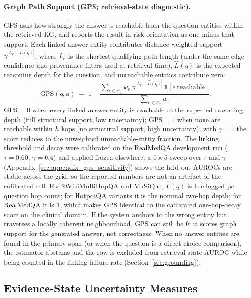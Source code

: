 \paragraph{Graph Path Support (GPS; retrieval-state diagnostic).}
GPS asks how strongly the answer is reachable from the question entities
within the retrieved KG, and reports the result in risk orientation as one
minus that support.
Each linked answer entity contributes distance-weighted support
$\gamma^{|L_e-\hat L(q)|}$, where $L_e$ is the shortest qualifying path
length (under the same edge-confidence and provenance filters used at
retrieval time), $\hat L(q)$ is the expected reasoning depth for the question,
and unreachable entities contribute zero:
\begin{equation}
  \mathrm{GPS}(q, a) \;=\;
  1 -
  \frac{\sum_{e \in \mathcal{E}_a} w_e\, \gamma^{|L_e-\hat L(q)|}\,
        \mathbb{1}[e\ \mathrm{reachable}]}
       {\sum_{e \in \mathcal{E}_a} w_e}.
\end{equation}
$\mathrm{GPS} = 0$ when every linked answer entity is reachable at the
expected reasoning depth (full structural support, low uncertainty);
$\mathrm{GPS} = 1$ when none are reachable within $h$ hops (no structural
support, high uncertainty); with $\gamma = 1$ the score reduces to the
unweighted unreachable-entity fraction.
The linking threshold and decay were calibrated on the RealMedQA development
run ($\tau = 0.60$, $\gamma = 0.4$) and applied frozen elsewhere; a
$5\times5$ sweep over $\tau$ and $\gamma$
(Appendix~\ref{sec:appendix_gps_sensitivity}) shows the held-out AUROCs are
stable across the grid, so the reported numbers are not an artefact of the
calibrated cell.
For 2WikiMultiHopQA and MuSiQue, $\hat L(q)$ is the logged per-question hop
count; for HotpotQA variants it is the nominal two-hop depth; for RealMedQA it
is $1$, which makes GPS identical to the calibrated one-hop-decay score on
the clinical domain.
If the system anchors to the wrong entity but traverses a locally coherent
neighbourhood, GPS can still be $0$: it scores graph support for the generated
answer, not correctness.
When no answer entities are found in the primary span (or when the
question is a direct-choice comparison), the estimator abstains and the row is
excluded from retrieval-state AUROC while being counted in the
linking-failure rate (Section~\ref{sec:grounding}).

\subsection{Evidence-State Uncertainty Measures}
\label{sec:grounding_metrics}

